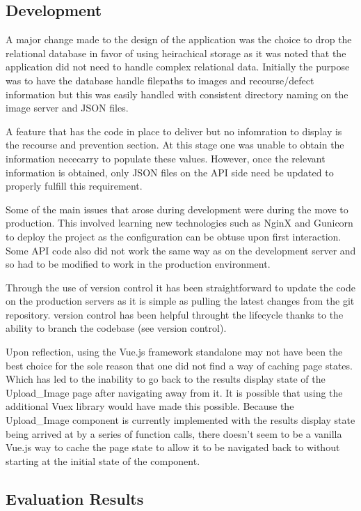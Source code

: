   \subsection{Development}
    A major change made to the design of the application was the choice to drop the relational database in favor of using heirachical storage as it was noted that the application did not need to handle complex relational data. Initially the purpose was to have the database handle filepaths to images and recourse/defect information but this was easily handled with consistent directory naming on the image server and JSON files.
    \par
    A feature that has the code in place to deliver but no infomration to display is the recourse and prevention section. At this stage one was unable to obtain the information nececarry to populate these values. However, once the relevant information is obtained, only JSON files on the API side need be updated to properly fulfill this requirement.
    \par
    Some of the main issues that arose during development were during the move to production. This involved learning new technologies such as NginX and Gunicorn to deploy the project as the configuration can be obtuse upon first interaction. Some API code also did not work the same way as on the development server and so had to be modified to work in the production environment.
    \par
    Through the use of version control it has been straightforward to update the code on the production servers as it is simple as pulling the latest changes from the git repository. version control has been helpful throught the lifecycle thanks to the ability to branch the codebase (see version control).
    \par
    Upon reflection, using the Vue.js framework standalone may not have been the best choice for the sole reason that one did not find a way of caching page states. Which has led to the inability to go back to the results display state of the Upload_Image page after navigating away from it. It is possible that using the additional Vuex library would have made this possible. Because the Upload_Image component is currently implemented with the results display state being arrived at by a series of function calls, there doesn't seem to be a vanilla Vue.js way to cache the page state to allow it to be navigated back to without starting at the initial state of the component.
    \subsection{Evaluation Results}
